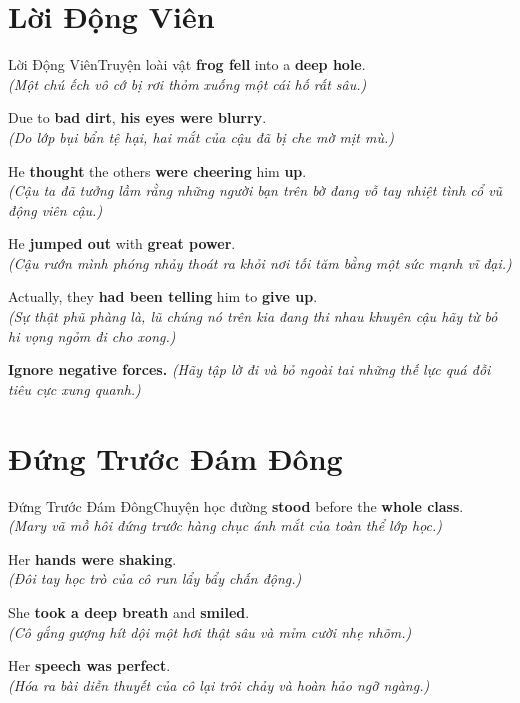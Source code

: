 \section{Lời Động Viên}
\begin{truyen}{Lời Động Viên}{Truyện loài vật}
 \textbf{frog fell} into a \textbf{deep hole}.\\
\textit{(Một chú ếch vô cớ bị rơi thỏm xuống một cái hố rất sâu.)}

Due to \textbf{bad dirt}, \textbf{his eyes were blurry}.\\
\textit{(Do lớp bụi bẩn tệ hại, hai mắt của cậu đã bị che mờ mịt mù.)}

He \textbf{thought} the others \textbf{were cheering} him \textbf{up}.\\
\textit{(Cậu ta đã tưởng lầm rằng những người bạn trên bờ đang vỗ tay nhiệt tình cổ vũ động viên cậu.)}

He \textbf{jumped out} with \textbf{great power}.\\
\textit{(Cậu rướn mình phóng nhảy thoát ra khỏi nơi tối tăm bằng một sức mạnh vĩ đại.)}

Actually, they \textbf{had been telling} him to \textbf{give up}.\\
\textit{(Sự thật phũ phàng là, lũ chúng nó trên kia đang thi nhau khuyên cậu hãy từ bỏ hi vọng ngỏm đi cho xong.)}
\end{truyen}

\begin{baihoc}
  \textbf{Ignore negative forces.} \textit{(Hãy tập lờ đi và bỏ ngoài tai những thế lực quá đỗi tiêu cực xung quanh.)}
\end{baihoc}

\vspace{0.8cm}

\ngayDay{}
\section{Đứng Trước Đám Đông}
\begin{truyen}{Đứng Trước Đám Đông}{Chuyện học đường}
 \textbf{stood} before the \textbf{whole class}.\\
\textit{(Mary vã mồ hôi đứng trước hàng chục ánh mắt của toàn thể lớp học.)}

Her \textbf{hands were shaking}.\\
\textit{(Đôi tay học trò của cô run lẩy bẩy chấn động.)}

She \textbf{took a deep breath} and \textbf{smiled}.\\
\textit{(Cô gắng gượng hít dội một hơi thật sâu và mỉm cười nhẹ nhõm.)}

Her \textbf{speech was perfect}.\\
\textit{(Hóa ra bài diễn thuyết của cô lại trôi chảy và hoàn hảo ngỡ ngàng.)}
\end{truyen}

